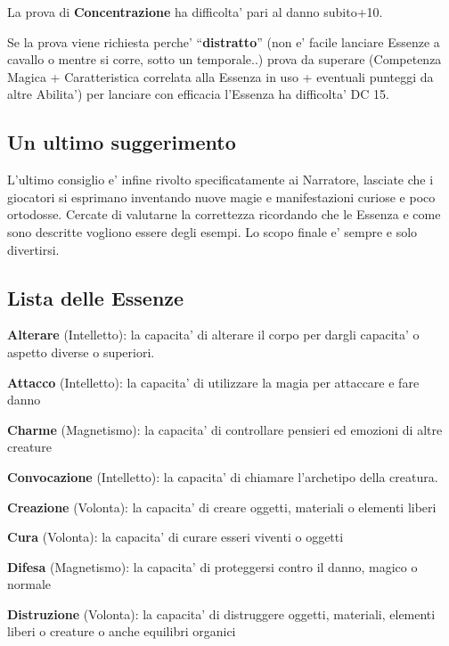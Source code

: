 \documentclass[a4paper,11pt,twoside,openany]{dndbook}
\begin{document}
La prova di \textbf{Concentrazione} ha difficolta' pari al danno subito+10.

Se la prova viene richiesta perche' ``\textbf{distratto}'' (non e' facile lanciare Essenze a cavallo o mentre si corre, sotto un temporale..) prova da superare (Competenza Magica + Caratteristica correlata alla Essenza in uso + eventuali punteggi da altre Abilita') per lanciare con efficacia l'Essenza ha difficolta' DC 15.

\subsection{Un ultimo suggerimento}

L'ultimo consiglio e' infine rivolto specificatamente ai Narratore, lasciate che i giocatori si esprimano inventando nuove magie e manifestazioni curiose e poco ortodosse. Cercate di valutarne la correttezza ricordando che le Essenza e come sono descritte vogliono essere degli esempi. Lo scopo finale e' sempre e solo divertirsi.

\subsection{Lista delle Essenze}

\textbf{Alterare} (Intelletto): la capacita' di alterare il corpo per dargli capacita' o aspetto diverse o superiori.

\textbf{Attacco} (Intelletto): la capacita' di utilizzare la magia per attaccare e fare danno

 \textbf{Charme} (Magnetismo): la capacita' di controllare pensieri
ed emozioni di altre creature

\textbf{Convocazione} (Intelletto): la capacita' di chiamare l'archetipo
della creatura.

\textbf{Creazione} (Volonta): la capacita' di creare oggetti, materiali o elementi liberi

\textbf{Cura} (Volonta): la capacita' di curare esseri viventi o oggetti

\textbf{Difesa} (Magnetismo): la capacita' di proteggersi contro il danno, magico o normale

\textbf{Distruzione} (Volonta): la capacita' di distruggere oggetti, materiali, elementi liberi o creature o anche equilibri organici
\end{document}
